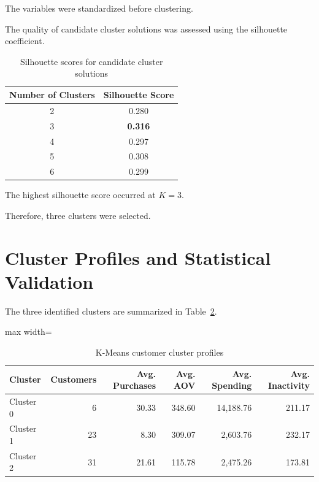 \documentclass[11pt,a4paper]{article}
\begin{document}
The variables were standardized before clustering.

The quality of candidate cluster solutions was assessed using the silhouette coefficient.

\begin{table}[H]
\centering
\caption{Silhouette scores for candidate cluster solutions}
\label{tab:silhouette}
\begin{tabular}{cc}
\toprule
\textbf{Number of Clusters} & \textbf{Silhouette Score}\\
\midrule
2 & 0.280\\
3 & \textbf{0.316}\\
4 & 0.297\\
5 & 0.308\\
6 & 0.299\\
\bottomrule
\end{tabular}
\end{table}

The highest silhouette score occurred at $K=3$.

Therefore, three clusters were selected.


\section{Cluster Profiles and Statistical Validation}

The three identified clusters are summarized in Table~\ref{tab:clusters}.

\begin{table}[H]
\centering
\caption{K-Means customer cluster profiles}
\label{tab:clusters}
\begin{adjustbox}{max width=\textwidth}
\begin{tabular}{lrrrrr}
\toprule
\textbf{Cluster} &
\textbf{Customers} &
\textbf{Avg. Purchases} &
\textbf{Avg. AOV} &
\textbf{Avg. Spending} &
\textbf{Avg. Inactivity}\\
\midrule
Cluster 0 & 6 & 30.33 & 348.60 & 14,188.76 & 211.17\\
Cluster 1 & 23 & 8.30 & 309.07 & 2,603.76 & 232.17\\
Cluster 2 & 31 & 21.61 & 115.78 & 2,475.26 & 173.81\\
\bottomrule
\end{tabular}
\end{adjustbox}
\end{table}
\end{document}
